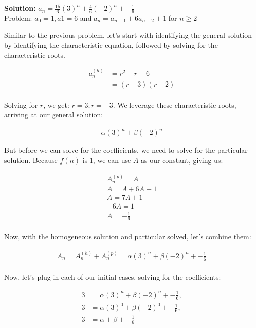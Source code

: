 \documentclass{article}
\begin{document}
\section{}

\textbf{Solution: } $
a_n = \frac{15}{6}(3)^n + \frac{4}{6}(-2)^n + -\frac{1}{6}$ \\

Problem: $a_0 = 1, a1=6$ and $a_n=a_{n-1} + 6a_{n-2} + 1$ for $n \ge 2$

Similar to the previous problem, let's start with identifying the general solution by identifying the characteristic equation, followed by solving for the characteristic roots.

\begin{align*}
    a^{(h)}_n &= r^2 - r - 6 \\
              &= (r-3)(r+2) \\
\end{align*}

Solving for $r$, we get: $r=3; r=-3$. We leverage these characteristic roots, arriving at our general solution:

\begin{align*}
\alpha(3)^n + \beta(-2)^n
\end{align*}

But before we can solve for the coefficients, we need to solve for the particular solution. Because $f(n)$ is 1, we can use $A$ as our constant, giving us:

\begin{align*}
A^{(p)}_n = A \\
A = A + 6A + 1 \\
A = 7A + 1 \\
-6A = 1 \\
A = -\frac{1}{6} \\
\end{align*}

Now, with the homogeneous solution and particular solved, let's combine them:

\begin{align*}
A_n = A^{(h)}_n + A^{(p)}_n = \alpha(3)^n + \beta(-2)^n + -\frac{1}{6} \\
\end{align*}

Now, let's plug in each of our initial cases, solving for the coefficients:

\begin{align*}
3 &= \alpha(3)^n + \beta(-2)^n + -\frac{1}{6}, \\
3  &= \alpha(3)^0 + \beta(-2)^0 + -\frac{1}{6}, \\
3  &= \alpha + \beta + -\frac{1}{6} \\
\end{align*}
\end{document}
